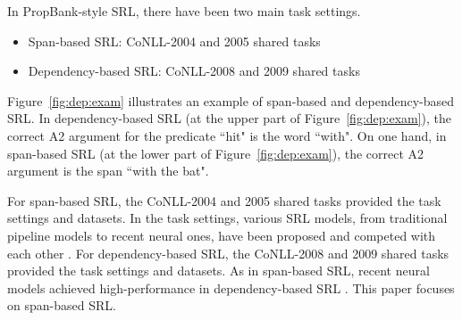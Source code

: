 \documentclass[11pt,a4paper]{article}
\begin{document}
In PropBank-style SRL, there have been two main task settings.
\begin{itemize}
\setlength{\parskip}{0cm} 
\setlength{\itemsep}{0cm} 
\item Span-based SRL: CoNLL-2004 and 2005 shared tasks \cite{carreras:04,carreras:05}
\item Dependency-based SRL:  CoNLL-2008 and 2009 shared tasks \cite{surdeanu:08,hajivc:09}
\end{itemize}

\noindent
Figure~\ref{fig:dep:exam} illustrates an example of span-based and dependency-based SRL.
In dependency-based SRL (at the upper part of Figure~\ref{fig:dep:exam}), the correct A2 argument for the predicate ``hit" is the word ``with".
On one hand, in span-based SRL (at the lower part of Figure~\ref{fig:dep:exam}), the correct A2 argument is the span ``with the bat".

For span-based SRL, the CoNLL-2004 and 2005 shared tasks \cite{carreras:04,carreras:05} provided the task settings and datasets.
In the task settings, various SRL models, from traditional pipeline models to recent neural ones, have been proposed and competed with each other \cite{pradhan:05,he:17,tan:18}.
For dependency-based SRL, the CoNLL-2008 and 2009 shared tasks \cite{surdeanu:08,hajivc:09} provided the task settings and datasets.
As in span-based SRL, recent neural models achieved high-performance in dependency-based SRL \cite{marcheggiani:17a,marcheggiani:17b,he:dep:18,cai:18}.
This paper focuses on span-based SRL.
\end{document}
